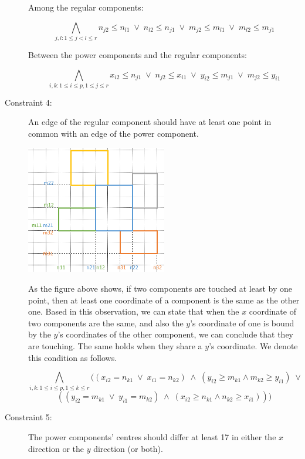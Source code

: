 \begin{description}
  Among the regular components:

  \[  \bigwedge_{j,l: 1 \leq j < l \leq r}
  n_{j2} \leq n_{l1} \; \vee \; n_{l2} \leq n_{j1} \; \vee \; m_{j2} \leq m_{l1} \; \vee \; m_{l2} \leq m_{j1}  \]

  Between the power components and the regular components:

  \[  \bigwedge_{i,k: 1 \leq i \leq p, 1 \leq j \leq r}
   x_{i2} \leq n_{j1} \; \vee \; n_{j2} \leq x_{i1} \; \vee \; y_{i2} \leq m_{j1} \; \vee \; m_{j2} \leq y_{i1} \]

  \item[Constraint 4:] An edge of the regular component should have at least one point in common with an edge of the power component.

\begin{center}
\includegraphics[width=0.5\textwidth]{Part1_2_2.png}
\end{center}

  As the figure above shows, if two components are touched at least by one point, then at least one coordinate of a component is the same as the other one. Based in this observation, we can state that when the $x$ coordinate of two components are the same, and also the $y$'s coordinate of one is bound by the $y$'s coordinates of the other component, we can conclude that they are touching. The same holds when they share a $y$'s coordinate. We denote this condition as follows.

  \[  \bigwedge_{i,k: 1 \leq i \leq p, 1 \leq k \leq r}
  ((x_{i2} = n_{k1} \; \vee \; x_{i1} = n_{k2}) \; \wedge \;
  (y_{i2} \geq m_{k1} \wedge m_{k2} \geq y_{i1}) \; \vee \; \]
  \[  ((y_{i2} = m_{k1} \; \vee \; y_{i1} = m_{k2}) \; \wedge \;
  (x_{i2} \geq n_{k1} \wedge n_{k2} \geq x_{i1}))) \]
  
  \item[Constraint 5:] The power components' centres should differ at least 17 in either the $x$ direction or the $y$ direction (or both).


\end{description}
